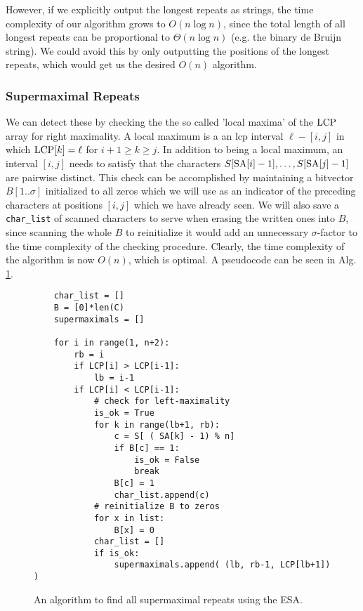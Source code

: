 However, if we explicitly output the longest repeats as strings, the time complexity of our algorithm grows to $O(n \log n)$, since the total length of all longest repeats can be proportional to $\Theta(n \log n)$ (e.g. the binary de Bruijn string).
We could avoid this by only outputting the positions of the longest repeats, which would get us the desired $O(n)$ algorithm. 

\subsubsection{Supermaximal Repeats}
We can detect these by checking the the so called 'local maxima' of the $\text{LCP}$ array for right maximality.
A local maximum is a an lcp interval $\ell-[i,j]$ in which $\text{LCP}[k] = \ell$ for $i+1 \geq k \geq j$.
In addition to being a local maximum, an interval $[i,j]$ needs to satisfy that the characters $S[\text{SA}[i] - 1], \ldots, S[\text{SA}[j] - 1]$ are pairwise distinct.
This check can be accomplished by maintaining a bitvector $B[1..\sigma]$ initialized to all zeros which we will use as an indicator of the preceding characters at positions $[i, j]$ which we have already seen.
We will also save a \texttt{char\_list} of scanned characters to serve when erasing the written ones into $B$, since scanning the whole $B$  to reinitialize it would add an unnecessary $\sigma$-factor to the time complexity of the checking procedure.
Clearly, the time complexity of the algorithm is now $O(n)$, which is optimal.
A pseudocode can be seen in Alg. \ref{alg:supermaximal}.

\begin{figure}[!ht]
    \centering
    \begin{verbatim}
    char_list = []
    B = [0]*len(C)
    supermaximals = []
    
    for i in range(1, n+2):
        rb = i
        if LCP[i] > LCP[i-1]:
            lb = i-1
        if LCP[i] < LCP[i-1]:
            # check for left-maximality
            is_ok = True
            for k in range(lb+1, rb):
                c = S[ ( SA[k] - 1) % n]
                if B[c] == 1:
                    is_ok = False
                    break
                B[c] = 1
                char_list.append(c)
            # reinitialize B to zeros
            for x in list:
                B[x] = 0
            char_list = []
            if is_ok:
                supermaximals.append( (lb, rb-1, LCP[lb+1]) )
    \end{verbatim}
    \caption{An algorithm to find all supermaximal repeats using the ESA.}
    \label{alg:supermaximal}
\end{figure}

